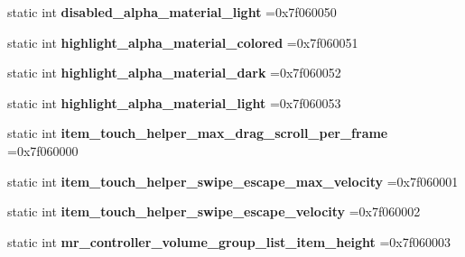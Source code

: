 \begin{DoxyCompactItemize}
static int {\bfseries disabled\+\_\+alpha\+\_\+material\+\_\+light} =0x7f060050
\item 
\mbox{\label{classandroid_1_1support_1_1v7_1_1cardview_1_1R_1_1dimen_a59fbf97b14bc7d7ceb62fce02dc07d72}} 
static int {\bfseries highlight\+\_\+alpha\+\_\+material\+\_\+colored} =0x7f060051
\item 
\mbox{\label{classandroid_1_1support_1_1v7_1_1cardview_1_1R_1_1dimen_a0571a73794bd5f3ab14e048027e0cb88}} 
static int {\bfseries highlight\+\_\+alpha\+\_\+material\+\_\+dark} =0x7f060052
\item 
\mbox{\label{classandroid_1_1support_1_1v7_1_1cardview_1_1R_1_1dimen_ac2a9a23498a3aa238f809f8e9ef72b70}} 
static int {\bfseries highlight\+\_\+alpha\+\_\+material\+\_\+light} =0x7f060053
\item 
\mbox{\label{classandroid_1_1support_1_1v7_1_1cardview_1_1R_1_1dimen_a8e1cdd311ad9efcaa7617b5ff9a39f34}} 
static int {\bfseries item\+\_\+touch\+\_\+helper\+\_\+max\+\_\+drag\+\_\+scroll\+\_\+per\+\_\+frame} =0x7f060000
\item 
\mbox{\label{classandroid_1_1support_1_1v7_1_1cardview_1_1R_1_1dimen_a16ae37ec3fb9b541ddac920f85648093}} 
static int {\bfseries item\+\_\+touch\+\_\+helper\+\_\+swipe\+\_\+escape\+\_\+max\+\_\+velocity} =0x7f060001
\item 
\mbox{\label{classandroid_1_1support_1_1v7_1_1cardview_1_1R_1_1dimen_a135e6f247f156c6d06c619c6a2b0aecb}} 
static int {\bfseries item\+\_\+touch\+\_\+helper\+\_\+swipe\+\_\+escape\+\_\+velocity} =0x7f060002
\item 
\mbox{\label{classandroid_1_1support_1_1v7_1_1cardview_1_1R_1_1dimen_a6a093a763e3433c6cbde348fb6d1caf6}} 
static int {\bfseries mr\+\_\+controller\+\_\+volume\+\_\+group\+\_\+list\+\_\+item\+\_\+height} =0x7f060003
\item 
\mbox{\label{classandroid_1_1support_1_1v7_1_1cardview_1_1R_1_1dimen_a256a537045ee7012a0e95f1a57783590}} 

\end{DoxyCompactItemize}
